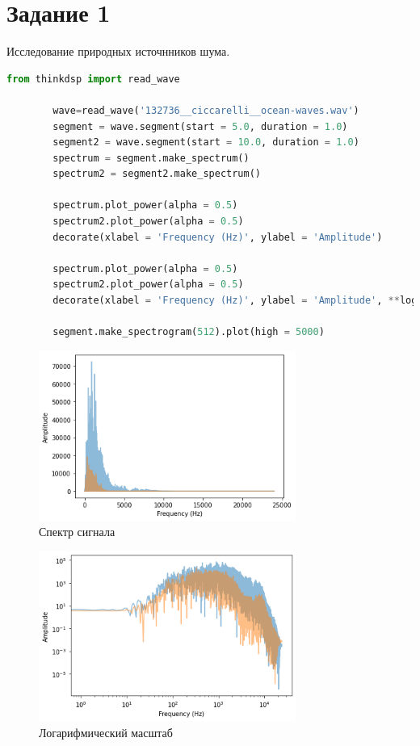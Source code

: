 \documentclass[a4paper, 12pt]{report}
\begin{document}
	\section{Задание 1}
	Исследование природных источнников шума.
	\begin{lstlisting}[language=Python,caption=Два сегмента сигнала с шумом моря]
		from thinkdsp import read_wave

		wave=read_wave('132736__ciccarelli__ocean-waves.wav')
		segment = wave.segment(start = 5.0, duration = 1.0)
		segment2 = wave.segment(start = 10.0, duration = 1.0)
		spectrum = segment.make_spectrum()
		spectrum2 = segment2.make_spectrum()

		spectrum.plot_power(alpha = 0.5)
		spectrum2.plot_power(alpha = 0.5)
		decorate(xlabel = 'Frequency (Hz)', ylabel = 'Amplitude')

		spectrum.plot_power(alpha = 0.5)
		spectrum2.plot_power(alpha = 0.5)
		decorate(xlabel = 'Frequency (Hz)', ylabel = 'Amplitude', **loglog)

		segment.make_spectrogram(512).plot(high = 5000)
	\end{lstlisting}
	\begin{figure}[H]
		\centering
		\includegraphics[width=0.75\textwidth]{test1.png}
		\caption{Спектр сигнала}
		\label{fig:test1}
	\end{figure}
	\begin{figure}[H]
		\centering
		\includegraphics[width=0.75\textwidth]{test2.png}
		\caption{Логарифмический масштаб}
		\label{fig:test2}
	\end{figure}
\end{document}

